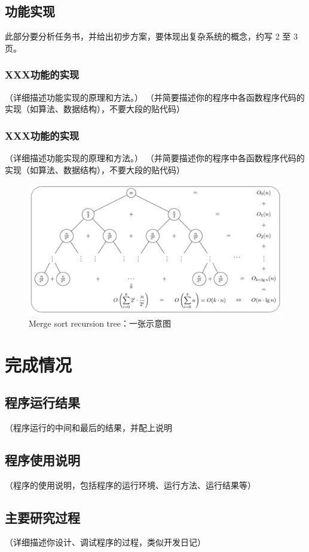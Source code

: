 \documentclass[UTF8,AutoFakeBold,AutoFakeSlant,zihao=-4]{ctexart}
\begin{document}
\subsection{功能实现}
此部分要分析任务书，并给出初步方案，要体现出复杂系统的概念，约写 2 至 3 页。

\subsubsection{XXX功能的实现}
（详细描述功能实现的原理和方法。）
（并简要描述你的程序中各函数程序代码的实现（如算法、数据结构），不要大段的贴代码）

\subsubsection{XXX功能的实现}
（详细描述功能实现的原理和方法。）
（并简要描述你的程序中各函数程序代码的实现（如算法、数据结构），不要大段的贴代码）

\begin{figure}[!ht]
  \centering
  \includegraphics[width=0.6\linewidth]{img/merge-sort-recursion-tree}
  \caption{Merge sort recursion tree：一张示意图}
  \label{fig:mergesort}
\end{figure}



\section{完成情况}

\subsection{程序运行结果}
（程序运行的中间和最后的结果，并配上说明

\subsection{程序使用说明}
（程序的使用说明，包括程序的运行环境、运行方法、运行结果等）

\subsection{主要研究过程}
（详细描述你设计、调试程序的过程，类似开发日记）
\end{document}
